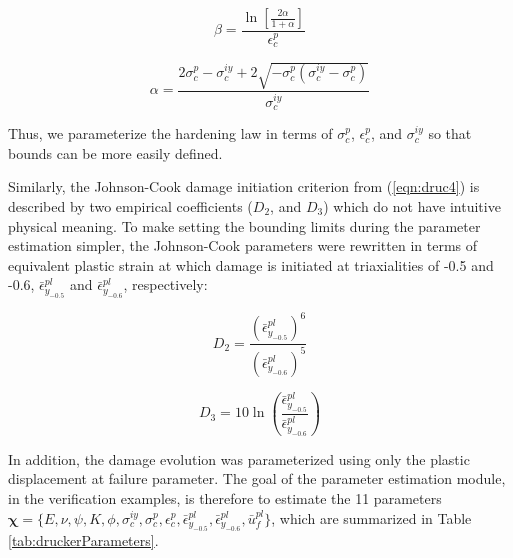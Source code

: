 \begin{equation}
\beta=\frac{\ln\left[\frac{2\alpha}{1+\alpha} \right ]}{\epsilon_c^{p}}
\label{eqn:param2-2}
\end{equation}

\begin{equation}
\alpha =\frac{2\sigma_c^{p}-\sigma_c^{iy}+2\sqrt{-\sigma_c^p\left(\sigma_c^{iy}-\sigma_c^p \right )}}{\sigma_c^{iy}}
\label{eqn:param2-3}
\end{equation}

Thus, we parameterize the hardening law in terms of $\sigma_{c}^{p}$, $\epsilon_c^{p}$, and  $\sigma_c^{iy}$ so that bounds can be more easily defined.

Similarly, the Johnson-Cook damage initiation criterion from (\ref{eqn:druc4}) is described by two empirical coefficients ($D_2$, and $D_3$) which do not have intuitive physical meaning. To make setting the bounding limits during the parameter estimation simpler, the Johnson-Cook parameters were rewritten in terms of equivalent plastic strain at which damage is initiated at triaxialities of -0.5 and -0.6, $\bar{\epsilon}^{pl}_{y_{-0.5}}$ and $\bar{\epsilon}^{pl}_{y_{-0.6}}$, respectively:

\begin{equation}
D_2=\frac{\left(\bar{\epsilon}^{pl}_{y_{-0.5}}\right)^6}{\left(\bar{\epsilon}^{pl}_{y_{-0.6}}\right)^5}
\label{eqn:dparam8}
\end{equation}

\begin{equation}
D_3=10\ln \left (\frac{\bar{\epsilon}^{pl}_{y_{-0.5}}}{\bar{\epsilon}^{pl}_{y_{-0.6}}}\right )
\label{eqn:dparam9}
\end{equation}

In addition, the damage evolution was parameterized using only the plastic displacement at failure parameter. The goal of the parameter estimation module, in the verification examples, is therefore to estimate the 11 parameters $\boldsymbol{\chi}=\{E,\nu,\psi, K, \phi, \sigma_c^{iy},\allowbreak\sigma_{c}^{p}, \epsilon_c^{p}, \bar{\epsilon}^{pl}_{y_{-0.5}},\allowbreak \bar{\epsilon}^{pl}_{y_{-0.6}},\bar{u}^{pl}_f \}$, which are summarized in Table \ref{tab:druckerParameters}.

